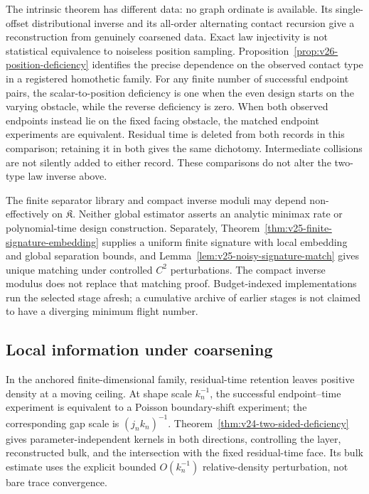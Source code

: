 The intrinsic theorem has different data: no graph ordinate is available.
Its single-offset distributional inverse and its all-order alternating
contact recursion give a reconstruction from genuinely coarsened data.
Exact law injectivity is not statistical equivalence to noiseless position
sampling.  Proposition~\ref{prop:v26-position-deficiency} identifies
the precise dependence on the observed contact type in a registered
homothetic family.  For any finite number of successful endpoint pairs,
the scalar-to-position deficiency is one when the even design starts
on the varying obstacle, while the reverse deficiency is zero.  When
both observed endpoints instead lie on the fixed facing obstacle, the
matched endpoint experiments are equivalent.  Residual time is deleted
from both records in this comparison; retaining it in both gives the
same dichotomy.  Intermediate collisions are not silently added to either
record.  These comparisons do not alter the two-type law inverse above.

The finite separator library and compact inverse moduli may depend
non-effectively on \(\mathfrak K\).  Neither global estimator asserts an
analytic minimax rate or polynomial-time design construction.  Separately,
Theorem~\ref{thm:v25-finite-signature-embedding} supplies a uniform finite
signature with local embedding and global separation bounds, and
Lemma~\ref{lem:v25-noisy-signature-match} gives unique matching under
controlled \(C^2\) perturbations.  The compact inverse modulus does not
replace that matching proof.  Budget-indexed implementations run the selected
stage afresh; a cumulative archive of earlier stages is not claimed to
have a diverging minimum flight number.

\subsection{Local information under coarsening}

In the anchored finite-dimensional family, residual-time retention leaves
positive density at a moving ceiling.  At shape scale \(k_n^{-1}\), the
successful endpoint--time experiment is equivalent to a Poisson boundary-shift
experiment; the corresponding gap scale is \((j_nk_n)^{-1}\).
Theorem~\ref{thm:v24-two-sided-deficiency} gives parameter-independent kernels
in both directions, controlling the layer, reconstructed bulk, and the
intersection with the fixed residual-time face.  Its bulk estimate uses the
explicit bounded \(O(k_n^{-1})\) relative-density perturbation, not bare
trace convergence.

